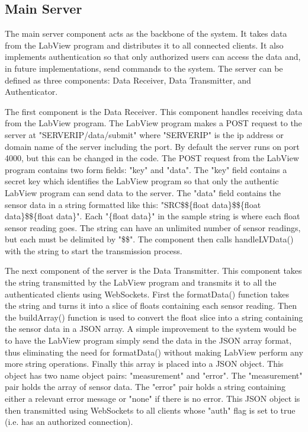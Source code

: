 \documentclass[10pt,technote]{IEEEtran}
\begin{document}
\subsection{Main Server}
The main server component acts as the backbone of the system. It takes data from the LabView program and distributes it to all connected clients. It also implements authentication so that only authorized users can access the data and, in future implementations, send commands to the system. The server can be defined as three components: Data Receiver, Data Transmitter, and Authenticator.
\par
The first component is the Data Receiver. This component handles receiving data from the LabView program. The LabView program makes a POST request to the server at "SERVERIP/data/submit" where "SERVERIP" is the ip address or domain name of the server including the port. By default the server runs on port 4000, but this can be changed in the code. The POST request from the LabView program contains two form fields: "key" and "data". The "key" field contains a secret key which identifies the LabView program so that only the authentic LabView program can send data to the server. The "data" field contains the sensor data in a string formatted like this: "SRC\$\$\{float data\}\$\$\{float data\}\$\$\{float data\}". Each "\{float data\}" in the sample string is where each float sensor reading goes. The string can have an unlimited number of sensor readings, but each must be delimited by "\$\$". The component then calls handleLVData() with the string to start the transmission process.
\par
The next component of the server is the Data Transmitter. This component takes the string transmitted by the LabView program and transmits it to all the authenticated clients using WebSockets. First the formatData() function takes the string and turns it into a slice of floats containing each sensor reading. Then the buildArray() function is used to convert the float slice into a string containing the sensor data in a JSON array. A simple improvement to the system would be to have the LabView program simply send the data in the JSON array format, thus eliminating the need for formatData() without making LabView perform any more string operations. Finally this array is placed into a JSON object. This object has two name object pairs: "measurement" and "error". The "measurement" pair holds the array of sensor data. The "error" pair holds a string containing either a relevant error message or "none" if there is no error. This JSON object is then transmitted using WebSockets to all clients whose "auth" flag is set to true (i.e. has an authorized connection).
\end{document}
